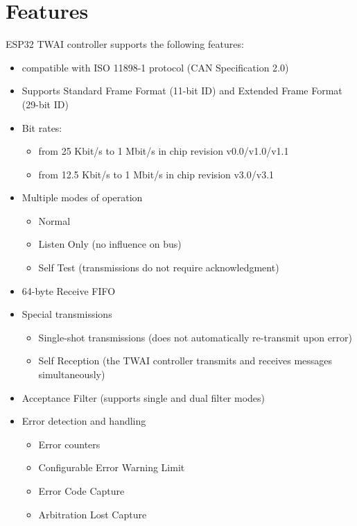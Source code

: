 \documentclass[main\_\_EN.tex]{subfiles}
\begin{document}
\section{Features}
ESP32 TWAI controller supports the following features:
\begin{itemize}
    \item compatible with ISO 11898-1 protocol (CAN Specification 2.0)
    \item Supports Standard Frame Format (11-bit ID) and Extended Frame Format (29-bit ID)
    \item Bit rates:
    \begin{itemize}
        \item from 25 Kbit/s to 1 Mbit/s in chip revision v0.0/v1.0/v1.1
        \item from 12.5 Kbit/s to 1 Mbit/s in chip revision v3.0/v3.1
    \end{itemize}
    \item Multiple modes of operation
    \begin{itemize}
        \item Normal
        \item Listen Only (no influence on bus)
        \item Self Test (transmissions do not require acknowledgment)
    \end{itemize}
    \item 64-byte Receive FIFO
    \item Special transmissions
    \begin{itemize}
        \item Single-shot transmissions (does not automatically re-transmit upon error)
        \item Self Reception (the TWAI controller transmits and receives messages simultaneously)
    \end{itemize}
    \item Acceptance Filter (supports single and dual filter modes)
    \item Error detection and handling
    \begin{itemize}
        \item Error counters
        \item Configurable Error Warning Limit
        \item Error Code Capture
        \item Arbitration Lost Capture
    \end{itemize}
\end{itemize}
\end{document}
